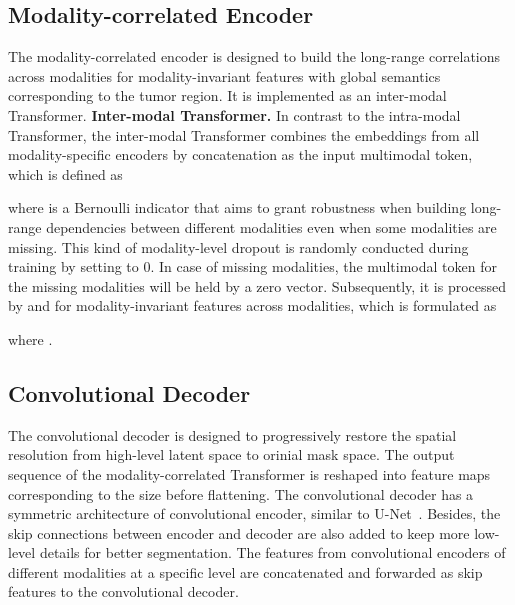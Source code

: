 \documentclass[runningheads]{llncs}
\begin{document}
\subsection{Modality-correlated Encoder}
The modality-correlated encoder is designed to build the long-range correlations across modalities for modality-invariant features with global semantics corresponding to the tumor region. It is implemented as an inter-modal Transformer. 
\noindent\textbf{Inter-modal Transformer.} In contrast to the intra-modal Transformer, the inter-modal Transformer combines the embeddings from all modality-specific encoders by concatenation as the input multimodal token, which is defined as

where  is a Bernoulli indicator that aims to grant robustness when building long-range dependencies between different modalities even when some modalities are missing. This kind of modality-level dropout is randomly conducted during training by setting  to 0. In case of missing modalities, the multimodal token for the missing modalities will be held by a zero vector.
Subsequently, it is processed by  and  for modality-invariant features across modalities, which is formulated as

where .

\subsection{Convolutional Decoder}
The convolutional decoder is designed to progressively restore the spatial resolution from high-level latent space to orinial mask space. The output sequence  of the modality-correlated Transformer is reshaped into feature maps corresponding to the size before flattening. The convolutional decoder has a symmetric architecture of convolutional encoder, similar to U-Net~\cite{ronneberger2015u}. Besides, the skip connections between encoder and decoder are also added to keep more low-level details for better segmentation. The features from convolutional encoders of different modalities at a specific level are concatenated and forwarded as skip features to the convolutional decoder.
\end{document}
